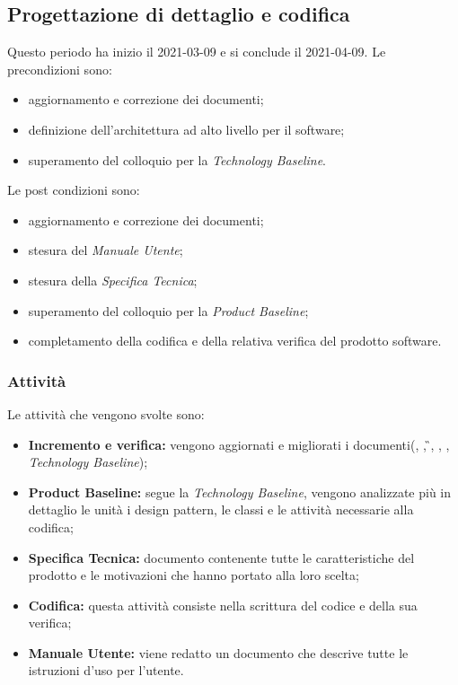 \newpage
\subsection{Progettazione di dettaglio e codifica}
Questo periodo ha inizio il 2021-03-09 e si conclude il 2021-04-09.
Le precondizioni sono:
\begin{itemize}
	\item aggiornamento e correzione dei documenti;
	\item definizione dell'architettura ad alto livello per il software;
	\item  superamento del colloquio per la \textit{Technology Baseline}.
\end{itemize}
Le post condizioni sono:
\begin{itemize}
	\item aggiornamento e correzione dei documenti;
	\item stesura del \textit{Manuale Utente};
	\item stesura della \textit{Specifica Tecnica};
	\item superamento del colloquio per la \textit{Product Baseline};
	\item completamento della codifica e della relativa verifica del prodotto software.
\end{itemize}
\subsubsection{Attività}
Le attività che vengono svolte sono:
\begin{itemize}
	\item \textbf{Incremento e verifica:} vengono aggiornati e migliorati i documenti(\NdP{}, \PdP{}, \G{}, \PdQ{}, \AdR{}, \textit{Technology Baseline});
	\item \textbf{Product Baseline:} segue la \textit{Technology Baseline}, vengono analizzate più in dettaglio le unità i design pattern, le classi e le attività necessarie alla codifica;
	\item \textbf{Specifica Tecnica:} documento contenente tutte le caratteristiche del prodotto e le motivazioni che hanno portato alla loro scelta;
	\item \textbf{Codifica:} questa attività consiste nella scrittura del codice e della sua verifica;
	\item \textbf{Manuale Utente:} viene redatto un documento che descrive tutte le istruzioni d'uso per l'utente.
\end{itemize}
